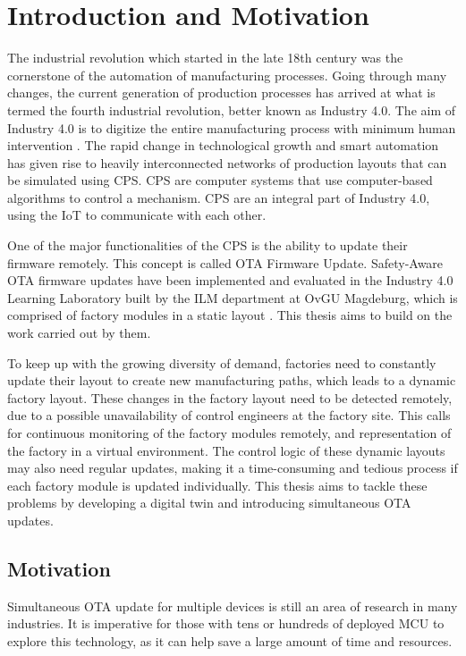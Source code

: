 \chapter{Introduction and Motivation}
\label{ch:introduction}
The industrial revolution which started in the late 18th century was the cornerstone of the automation of manufacturing processes. Going through many changes, the current generation of production processes has arrived at what is termed the fourth industrial revolution, better known as Industry 4.0. The aim of Industry 4.0 is to digitize the entire manufacturing process with minimum human intervention \cite{grznar2020modeling}. The rapid change in technological growth and smart automation has given rise to heavily interconnected networks of production layouts that can be simulated using \acrfull{CPS}. \acrshort{CPS} are computer systems that use computer-based algorithms to control a mechanism. \acrshort{CPS} are an integral part of Industry 4.0, using the \acrfull{IoT} to communicate with each other. 

One of the major functionalities of the \acrshort{CPS} is the ability to update their firmware remotely. This concept is called \acrfull{OTA} Firmware Update. Safety-Aware \acrlong{OTA} firmware updates have been implemented and evaluated in the Industry 4.0 Learning Laboratory built by the ILM department at OvGU Magdeburg, which is comprised of factory modules in a static layout \cite{Karri_2021}. This thesis aims to build on the work carried out by them.

To keep up with the growing diversity of demand, factories need to constantly update their layout to create new manufacturing paths, which leads to a dynamic factory layout. These changes in the factory layout need to be detected remotely, due to a possible unavailability of control engineers at the factory site. This calls for continuous monitoring of the factory modules remotely, and representation of the factory in a virtual environment. The control logic of these dynamic layouts may also need regular updates, making it a time-consuming and tedious process if each factory module is updated individually. This thesis aims to tackle these problems by developing a digital twin and introducing simultaneous \acrshort{OTA} updates.
\section{Motivation}
\label{sec:motivation}

Simultaneous \acrshort{OTA} update for multiple devices is still an area of research in many industries. It is imperative for those with tens or hundreds of deployed \acrfull{MCU} to explore this technology, as it can help save a large amount of time and resources.

